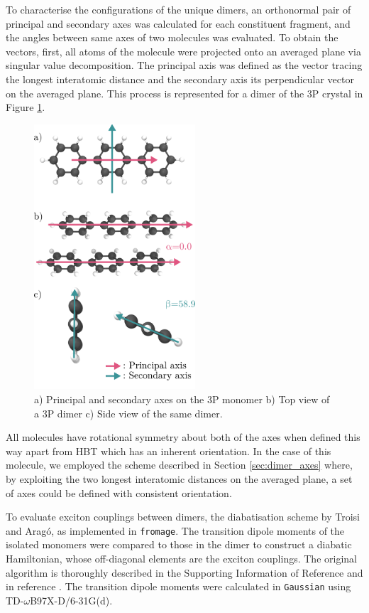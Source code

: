 To characterise the configurations of the unique dimers, an orthonormal pair of principal and secondary axes was calculated for each constituent fragment, and the angles between same axes of two molecules was evaluated. To obtain the vectors, first, all atoms of the molecule were projected onto an averaged plane via singular value decomposition. The principal axis was defined as the vector tracing the longest interatomic distance and the secondary axis its perpendicular vector on the averaged plane.\cite{Rivera2020} This process is represented for a dimer of the 3P crystal in Figure \ref{fig:axes}.

\begin{figure}
\centering
\includegraphics[width=6cm]{Chapters/7Applications/axes.pdf}
\caption{a) Principal and secondary axes on the 3P monomer b) Top view of a 3P dimer c) Side view of the same dimer.}
\label{fig:axes}
\end{figure}

All molecules have rotational symmetry about both of the axes when defined this way apart from HBT which has an inherent orientation. In the case of this molecule, we employed the scheme described in Section \ref{sec:dimer_axes} where, by exploiting the two longest interatomic distances on the averaged plane, a set of axes could be defined with consistent orientation.

To evaluate exciton couplings between dimers, the diabatisation scheme by Troisi and Arag\'o\cite{Arag2015}, as implemented in \texttt{fromage}. The transition dipole moments of the isolated monomers were compared to those in the dimer to construct a diabatic Hamiltonian, whose off-diagonal elements are the exciton couplings. The original algorithm is thoroughly described in the Supporting Information of Reference  and in reference . The transition dipole moments were calculated in \texttt{Gaussian}\cite{g16} using TD-$\omega$B97X-D/6-31G(d).

